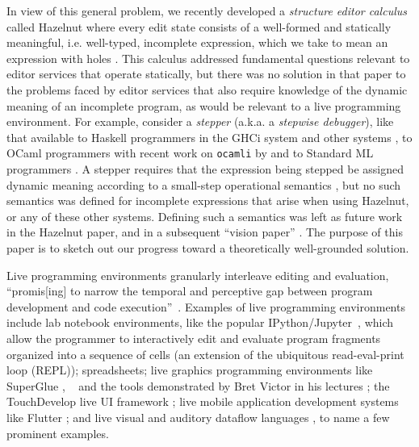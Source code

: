 In view of this general problem, we recently developed a \emph{structure editor calculus} called Hazelnut where every edit state consists of a well-formed and statically meaningful, i.e. well-typed, incomplete expression, which we take to mean an expression with holes \cite{popl-paper}. This calculus addressed fundamental questions relevant to editor services that operate statically, but there was no solution in that paper to the problems faced by editor services that also require knowledge of the dynamic meaning of an incomplete program, as would be relevant to a live programming environment. For example, consider a \emph{stepper} (a.k.a. a \emph{stepwise debugger}), like that available to Haskell programmers in the GHCi system \cite{GHC-stepper} and other systems \cite{DBLP:conf/haskell/MarlowIPG07,kar13566}, to OCaml programmers with recent work on \texttt{ocamli} by \citet{ocaml-stepper} and to Standard ML programmers \cite{DBLP:journals/jfp/TolmachA95}. A stepper requires that the expression being stepped be assigned dynamic meaning according to a small-step operational semantics \cite{DBLP:journals/jlp/Plotkin04a,pfpl}, but no such semantics was defined for incomplete expressions that arise when using Hazelnut, or any of these other systems. Defining such a semantics was left as future work in the Hazelnut paper, and in a subsequent ``vision paper'' \cite{snapl17-paper}. The purpose of this paper is to sketch out our progress toward a theoretically well-grounded solution.



Live programming environments granularly interleave editing and evaluation,
``promis[ing] to narrow the temporal and perceptive gap 
between program development and code execution''~\cite{burckhardt2013s}.
Examples of live programming environments include {lab notebook environments},
like the popular IPython/Jupyter~\cite{PER-GRA:2007}, which allow the
programmer to interactively edit and evaluate program fragments organized into a
sequence of cells (an extension of the ubiquitous read-eval-print loop (REPL)); spreadsheets; {live graphics programming environments} like SuperGlue \cite{McDirmid:2007}, \sns{}~\cite{sns-pldi,sns-uist} and the tools demonstrated by Bret Victor in his lectures \cite{victor2012inventing}; the TouchDevelop live UI framework \cite{burckhardt2013s}; live mobile application development systems like Flutter \cite{flutter}; and live visual and auditory dataflow languages \cite{DBLP:conf/vl/BurnettAW98}, to name a few prominent examples. 


